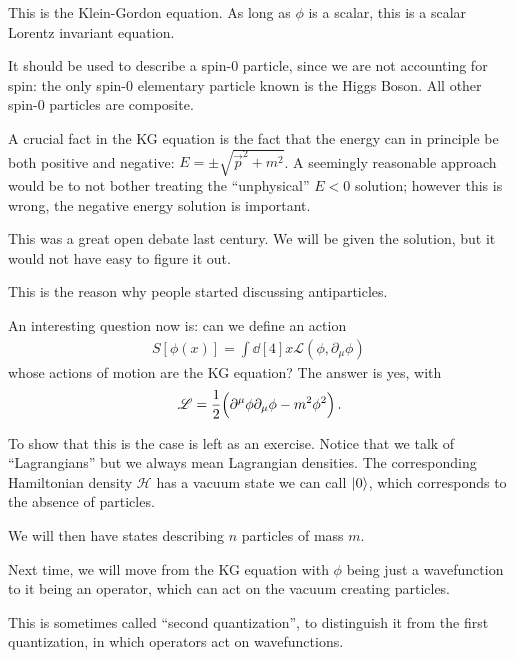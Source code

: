 \documentclass[main.tex]{subfiles}
\begin{document}
This is the Klein-Gordon equation. 
As long as \(\phi \) is a scalar, this is a scalar Lorentz invariant equation. 

It should be used to describe a spin-0 particle, since we are not accounting for spin: the only spin-0 elementary particle known is the Higgs Boson. 
All other spin-0 particles are composite. 

A crucial fact in the KG equation is the fact that the energy can in principle be both positive and negative: \(E = \pm \sqrt{\vec{p}^2 + m^2}\). 
A seemingly reasonable approach would be to not bother treating the ``unphysical'' \(E<0\) solution; however this is wrong, the negative energy solution is important. 

This was a great open debate last century. We will be given the solution, but it would not have easy to figure it out. 

This is the reason why people started discussing antiparticles.

An interesting question now is: can we define an action 
%
\begin{align}
S[\phi (x)] = \int \dd[4]{x} \mathscr{L} (\phi, \partial_{\mu } \phi )
\,
\end{align}
%
whose actions of motion are the KG equation? The answer is yes, with 
%
\begin{align}
\mathscr{L} = \frac{1}{2} \qty(\partial^{\mu } \phi \partial_{\mu } \phi - m^2 \phi^2)
\,.
\end{align}

To show that this is the case is left as an exercise.
Notice that we talk of ``Lagrangians'' but we always mean Lagrangian densities. 
The corresponding Hamiltonian density \(\mathscr{H}\) has a vacuum state we can call \(\ket{0}\), which corresponds to the absence of particles. 

We will then have states describing \(n\) particles of mass \(m\). 

Next time, we will move from the KG equation with \(\phi \) being just a wavefunction to it being an operator, which can act on the vacuum creating particles. 

This is sometimes called ``second quantization'', to distinguish it from the first quantization, in which operators act on wavefunctions. 
\end{document}

